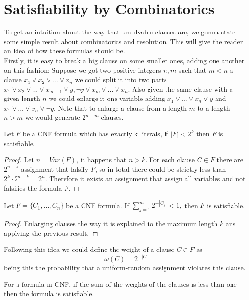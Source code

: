 \chapter{Satisfiability by Combinatorics}


To get an intuition about the way that unsolvable clauses are, we gonna state some simple result about combinatorics and resolution. This will give the reader an idea of how these formulas should be. \\

Firstly, it is easy to break a big clause on some smaller ones, adding one another on this fashion: Suppose we got two positive integers $n,m$ such that $m < n$ a clause $x_1\vee x_2 \vee ... \vee x_n$ we could split it into two parts $x_1\vee x_2  \vee ... \vee x_{m-1} \vee y, \neg y \vee x_m \vee ... \vee x_n$. Also given the same clause with a given length $n$ we could enlarge it one variable adding $ x_1 \vee ... \vee x_n \vee y$ and $ x_1 \vee ... \vee x_n \vee \neg y$. Note that to enlarge a clause from a length $m$ to a length $n>m$ we would generate $2^{n-m}$ clauses.


\begin{proposition}
	Let $F$ be a CNF formula which has exactly k literals, if $|F| < 2^k$ then $F$ is satisfiable.
\end{proposition}
\begin{proof}
	Let $n = Var(F)$, it happens that $n > k$. For each clause $C \in F$ there are $2^{n-k}$ assignment that falsify $F$, so in total there could be strictly less than $2^k \cdot 2^{n-k} = 2^n.$ Therefore it exists an assignment that assign all variables and not falsifies the formula $F$.
\end{proof}
\begin{proposition}
	Let $F=\{C_1,...,C_n\}$ be a CNF formula. If $\sum_{j=1}^m 2^{-|C_j|}<1,$ then $F$ is satisfiable.
\end{proposition}
\begin{proof}
	Enlarging clauses the way it is explained to the maximum length $k$ ans applying the previous result.
\end{proof}

Following this idea we could define the weight of a clause $C\in F$ as $$\omega(C) = 2^{-|C|} $$
being this the probability that a uniform-random assignment violates this clause. 

\begin{corollary}
	For a formula in CNF, if the sum of the weights of the clauses is less than one then the formula is satisfiable.
\end{corollary}


